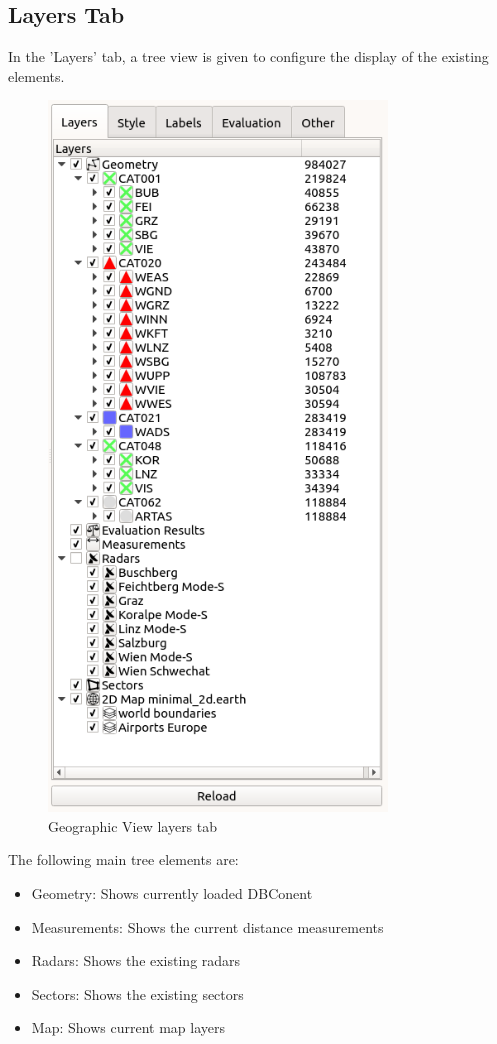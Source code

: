 \subsection{Layers Tab}

In the 'Layers' tab, a tree view is given to configure the display of the existing elements. 

\begin{figure}[H]
  \center
    \includegraphics[width=9cm,frame]{figures/geoview_config_panel.png}
  \caption{Geographic View layers tab}
\end{figure}

The following main tree elements are:\\

\begin{itemize}
 \item Geometry: Shows currently loaded DBConent
 \item Measurements: Shows the current distance measurements
 \item Radars: Shows the existing radars 
 \item Sectors: Shows the existing sectors
 \item Map: Shows current map layers
\end{itemize} 
 \ \\

